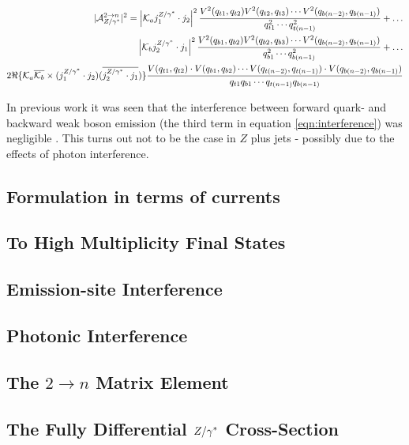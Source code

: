 		\begin{align}
		\begin{split}
		|\mathcal{A}_{Z/\gamma^*}^{2\rightarrow n}|^2 = \left|\mathcal{K}_a j_1^{Z/\gamma^*}\cdot j_2\right|^2 \frac{V^2(q_{t1}, q_{t2}) V^2(q_{t2}, q_{t3}) \cdots V^2(q_{b(n-2)}, q_{b(n-1)})}{q^2_{t1}\cdots q^2_{t(n-1)}} +\ldots\\
		\left|\mathcal{K}_b j_2^{Z/\gamma^*}\cdot j_1\right|^2 \frac{V^2(q_{b1}, q_{b2}) V^2(q_{b2}, q_{b3}) \cdots V^2(q_{b(n-2)}, q_{b(n-1)})}{q^2_{b1}\cdots q^2_{b(n-1)}} +\ldots\\
		2\Re\{\mathcal{K}_a\overline{\mathcal{K}_b} \times (j_1^{Z/\gamma^*}\cdot j_2)(\overline{j_2^{Z/\gamma^*}\cdot j_1})\}\frac{V(q_{t1}, q_{t2})\cdot V(q_{b1}, q_{b2})\cdots V(q_{t(n-2)}, q_{t(n-1)})\cdot V(q_{b(n-2)}, q_{b(n-1)})}{q_{t1}q_{b1}\cdots q_{t(n-1)}q_{b(n-1)}}
		\label{eqn:interference}
		\end{split}
		\end{align}

		In previous work it was seen that the interference between forward quark- and backward weak boson emission (the third term in equation \ref{eqn:interference}) was negligible \cite{Wjets}.  This turns out not to be the case in $Z$ plus jets - possibly due to the effects of photon interference.

		\subsection{Formulation in terms of currents}

		\subsection{To High Multiplicity Final States}

		\subsection{Emission-site Interference}

		\subsection{Photonic Interference}

		\subsection{The $2\rightarrow n$ Matrix Element}

		\subsection{The Fully Differential ${Z/\gamma^*}$ Cross-Section}

